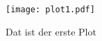   \begin{figure}
    \centering
    \texttt{[image: plot1.pdf]}
    \label{fig:plot1}
    \caption{Dat ist der erste Plot}
  \end{figure}
